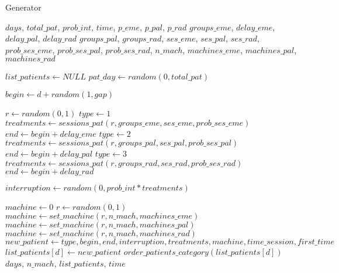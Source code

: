 \renewcommand{\algorithmicrequire}{\textbf{Input:}}

\begin{algorithm}
\caption{Generator}
\begin{algorithmic}[1]
\Require $days$, $total\_pat$, $prob\_int$, $time$, $p\_eme$, $p\_pal$, $p\_rad$ $groups\_eme$, $delay\_eme$, $delay\_pal$, $delay\_rad$ $groups\_pal$, $groups\_rad$, $ses\_eme$, $ses\_pal$, $ses\_rad$, $prob\_ses\_eme$, $prob\_ses\_pal$, $prob\_ses\_rad$, $n\_mach$, $machines\_eme$, $machines\_pal$, $machines\_rad$

\State $list\_patients \gets NULL$
\State $pat\_day \gets random(0, total\_pat)$

	    \State $begin \gets d + random(1, gap)$
	    
	    \State $r \gets random(0,1)$
		\State $type \gets 1$
		\State $treatments \gets sessions\_pat(r, groups\_eme, ses\_eme, prob\_ses\_eme)$
		\State $end \gets begin + delay\_eme$
		\State $type \gets 2$
		\State $treatments \gets sessions\_pat(r, groups\_pal, ses\_pal, prob\_ses\_pal)$
		\State $end \gets begin + delay\_pal$
	    \Else
		\State $type \gets 3$
		\State $treatments \gets sessions\_pat(r, groups\_rad, ses\_rad, 	prob\_ses\_rad)$
		\State $end \gets begin + delay\_rad$
	    \EndIf

	    \State $interruption \gets random(0, prob\_int * treatments)$
	    
	    \State $machine \gets 0$
	    \State $r \gets random(0,1)$
		  \State $machine \gets set\_machine(r, n\_mach, machines\_eme)$
		  \State $machine \gets set\_machine(r, n\_mach, machines\_pal)$
		  \State $machine \gets set\_machine(r, n\_mach, machines\_rad)$
	     \EndIf
	     \State
	     \State $new\_patient \gets type, begin, end, interruption, treatments, machine, time\_session, first\_time$
	     \State $list\_patients[d] \gets new\_patient$
	     \State $order\_patients\_category(list\_patients[d])$
      \EndFor
      \State \Return $days$, $n\_mach$, $list\_patients$, $time$
\EndFor

\EndProcedure
\end{algorithmic}
\end{algorithm}


